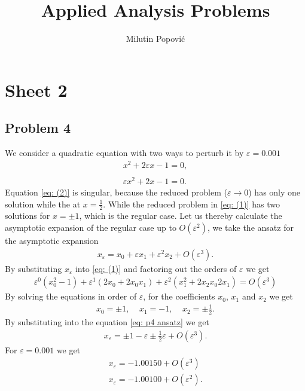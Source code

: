 \documentclass[a4paper]{article}
\title{Applied Analysis Problems}
\author{Milutin Popović}
\newcommand{\eps}{\varepsilon}
\begin{document}
\maketitle
\tableofcontents

\section{Sheet 2}
\subsection{Problem 4}
We consider a quadratic equation with two ways to perturb it by $\eps =
0.001$ \begin{align}
    x^2 + 2\eps x -1 = 0, \label{eq: (1)}\\
    \nonumber \\
    \eps x^2 + 2x - 1 = 0.\label{eq: (2)}
\end{align}
Equation \ref{eq: (2)} is singular, because the reduced problem ($\eps
\rightarrow 0$) has only one solution while the at $x = \frac{1}{2}$. While
the reduced problem in \ref{eq: (1)} has two solutions for $x = \pm 1$, which
is the regular case. Let us thereby calculate the asymptotic expansion of the
regular case up to $O(\eps^2)$, we take the ansatz for the asymptotic
expansion
\begin{align}\label{eq: p4 ansatz}
    x_\eps = x_0 + \eps x_1 + \eps^2 x_2 + O(\eps^3).
\end{align}
By substituting $x_\eps$ into \ref{eq: (1)} and factoring out the orders of
$\eps$ we get
\begin{align}
    \eps^0 (x_0^2 - 1) + \eps^1(2x_0 + 2x_0x_1) + \eps^2(x_1^2+2x_2x_0
    2x_1) = O(\eps^3)
\end{align}
By solving the equations in order of $\eps$, for the coefficients
$x_0$, $x_1$ and $x_2$ we get
\begin{align}
    x_0 = \pm 1, \;\;\;\; x_1 = -1, \;\;\;\; x_2 = \pm \frac{1}{2}.
\end{align}
By substituting into the equation \ref{eq: p4 ansatz} we get
\begin{align}
    x_\eps = \pm 1 - \eps \pm \frac{1}{2} \eps + O(\eps^3).
\end{align}
For $\eps = 0.001$ we get
\begin{align}
    x_\eps = -1.00150 + O(\eps^3)\\
    x_\eps = -1.00100 + O(\eps^2).
\end{align}
\end{document}
